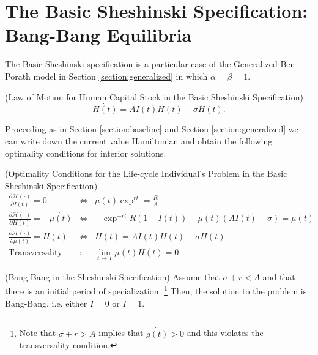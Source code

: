  
\section{The Basic Sheshinski Specification: Bang-Bang Equilibria}
The Basic Sheshinski specification is a particular case of the Generalized Ben-Porath model in Section \ref{section:generalized} in which $\alpha = \beta = 1$.
\begin{definition} (Law of Motion for Human Capital Stock in the Basic Sheshinski Specification)
\begin{equation}
\dot{H(t)} = AI(t)H(t) - \sigma H(t).
\end{equation}
\end{definition}

\indent Proceeding as in Section \ref{section:baseline} and Section \ref{section:generalized} we can write down the current value Hamiltonian and obtain the following optimality conditions for interior solutions.

\begin{condition} (Optimality Conditions for the Life-cycle Individual's Problem in the Basic Sheshinski Specification)
\begin{eqnarray}
\frac{\partial \mathcal{H} (\cdot)}{\partial I(t)} = 0 &\Leftrightarrow& \mu(t) \exp^{rt} = \frac{R}{A} \label{eq:focinvestmentshenbasic} \\
\frac{\partial \mathcal{H} (\cdot)}{\partial H(t)} = - \dot{\mu(t)} &\Leftrightarrow& - \exp^{-rt} R(1 - I(t)) - \mu(t) \left( A I(t) - \sigma \right) = \dot{\mu(t)} \label{eq:focstockshenbasic} \\ 
\frac{\partial \mathcal{H} (\cdot)}{\partial \mu(t)} = \dot{H(t)} &\Leftrightarrow& \dot{H(t)} =  A I(t) H(t)- \sigma H(t) \label{eq:focmotionshenbasic} \\
\text{Transversality} &:& \lim_{t \rightarrow T} \mu(t) H(t) = 0 \label{eq:foctransversalityshenbasic}
\end{eqnarray}
\end{condition}

\begin{claim} (Bang-Bang in the Sheshinski Specification) \label{claim:bangbang}
Assume that $\sigma + r < A$ and that there is an initial period of specialization. \footnote{Note that $\sigma + r > A$ implies that $\dot{g(t)} > 0$ and this violates the transversality condition.} Then, the solution to the problem is Bang-Bang, i.e. either $I = 0$ or $I = 1$. 
\end{claim}

